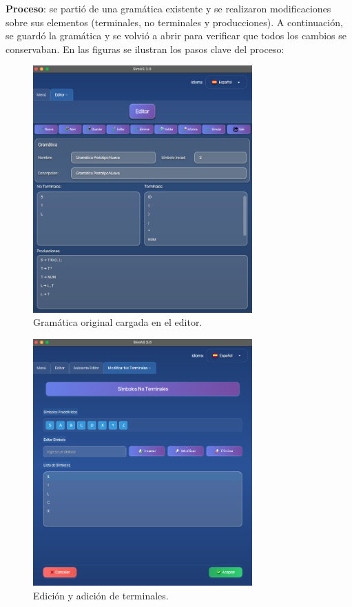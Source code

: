 \textbf{Proceso}: se partió de una gramática existente y se realizaron modificaciones sobre sus elementos (terminales, no terminales y producciones). A continuación, se guardó la gramática y se volvió a abrir para verificar que todos los cambios se conservaban. En las figuras se ilustran los pasos clave del proceso:
\medskip

\needspace{6cm}
\begin{figure}[H]
  \centering
  \includegraphics[width=0.75\textwidth]{figuras2/pruebas/editor/gramatica_original.png}
  \caption{Gramática original cargada en el editor.}
\end{figure}

\needspace{6cm}
\begin{figure}[H]
  \centering
  \includegraphics[width=0.75\textwidth]{figuras2/pruebas/editor/nuevos_terminales.png}
  \caption{Edición y adición de terminales.}
\end{figure}

